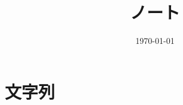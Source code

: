 \documentclass[6pt]{jreport}
\title{ノート}
\author{}
\date{\today}
\begin{document}
\maketitle
\tableofcontents

%
\chapter{文字列}

%
%
%
%
%
%
%



\end{document}
